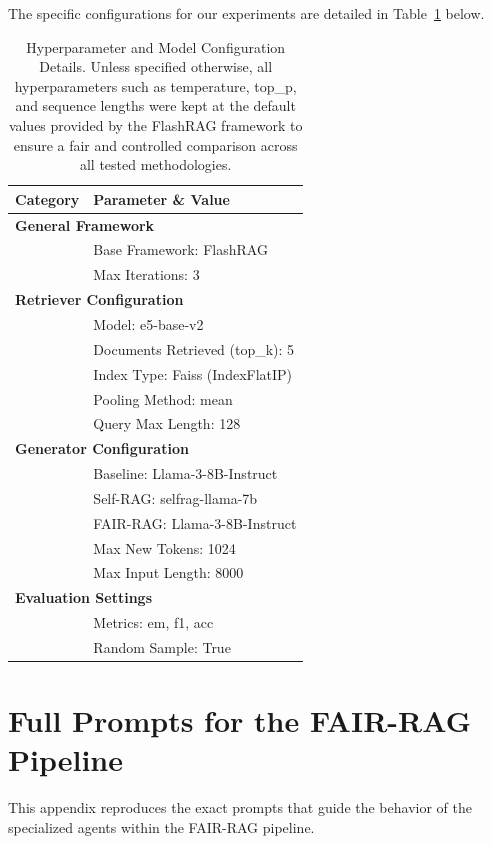 \documentclass[11pt]{article}
\begin{document}
The specific configurations for our experiments are detailed in Table~\ref{tab:hyperparameters} below.

\begin{table}[h]
\centering
\small
\begin{tabular}{ll}
\hline
\textbf{Category} & \textbf{Parameter \& Value} \\
\hline
\multicolumn{2}{l}{\textbf{General Framework}} \\
& Base Framework: FlashRAG \\
& Max Iterations: 3 \\
\hline
\multicolumn{2}{l}{\textbf{Retriever Configuration}} \\
& Model: e5-base-v2 \\
& Documents Retrieved (top\_k): 5 \\
& Index Type: Faiss (IndexFlatIP) \\
& Pooling Method: mean \\
& Query Max Length: 128 \\
\hline
\multicolumn{2}{l}{\textbf{Generator Configuration}} \\
& Baseline: Llama-3-8B-Instruct \\
& Self-RAG: selfrag-llama-7b \\
& FAIR-RAG: Llama-3-8B-Instruct \\
& Max New Tokens: 1024 \\
& Max Input Length: 8000 \\
\hline
\multicolumn{2}{l}{\textbf{Evaluation Settings}} \\
& Metrics: em, f1, acc \\
& Random Sample: True \\
\hline
\end{tabular}
\caption{Hyperparameter and Model Configuration Details. Unless specified otherwise, all hyperparameters such as temperature, top\_p, and sequence lengths were kept at the default values provided by the FlashRAG framework to ensure a fair and controlled comparison across all tested methodologies.}
\label{tab:hyperparameters}
\end{table}

\section{Full Prompts for the FAIR-RAG Pipeline}
\label{sec:appendix-prompts}

This appendix reproduces the exact prompts that guide the behavior of the specialized agents within the FAIR-RAG pipeline.
\end{document}
